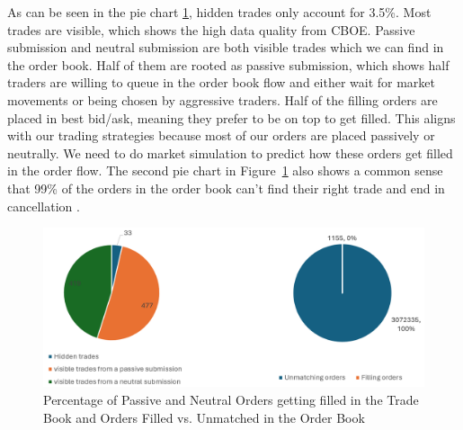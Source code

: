 As can be seen in the pie chart \ref{fig:p_of_AT_unma}, hidden trades only account for 3.5\%. Most trades are visible, which shows the high data quality from CBOE. Passive submission and neutral submission are both visible trades which we can find in the order book. Half of them are rooted as passive submission, which shows half traders are willing to queue in the order book flow and either wait for market movements or being chosen by aggressive traders. Half of the filling orders are placed in best bid/ask, meaning they prefer to be on top to get filled. This aligns with our trading strategies because most of our orders are placed passively or neutrally. We need to do market simulation to predict how these orders get filled in the order flow. The second pie chart in Figure~\ref{fig:p_of_AT_unma} also shows a common sense that 99\% of the orders in the order book can't find their right trade and end in cancellation \citep{gould2013limitorderbooks}.

\begin{figure}[h]
    \centering
    \includegraphics[width=0.8\linewidth]{figures/percentage_of_AT_unmatch.png}
    \caption{Percentage of Passive and Neutral Orders getting filled in the Trade Book and Orders Filled vs. Unmatched in the Order Book}
    \label{fig:p_of_AT_unma}
\end{figure}


